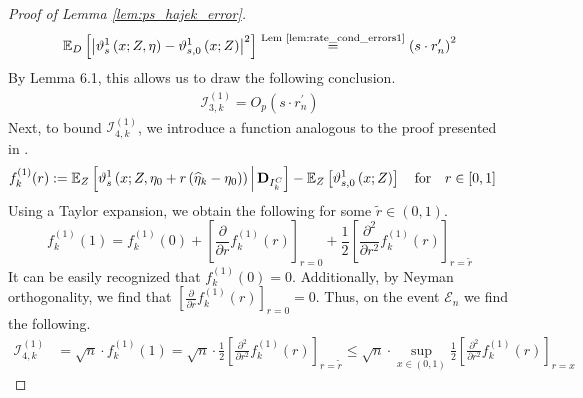 \begin{proof}[Proof of Lemma \ref{lem:ps_hajek_error}]
\begin{equation}
\begin{aligned}
             \mathbb{E}_{D}\left[\left|\vartheta_{s}^{1}\left(x; Z, \eta\right) - \vartheta_{s,0}^{1}\left(x; Z\right)\right|^{2}\right]
             \overset{\text{Lem \ref{lem:rate_cond_errors1}}}{=} \left(s \cdot r_{n}^{\prime}\right)^{2}
        \end{aligned}
    \end{equation}
    By \citet{chernozhukov_doubledebiased_2018} Lemma 6.1, this allows us to draw the following conclusion.
    \begin{equation}
        \begin{aligned}
            \mathcal{I}_{3,k}^{(1)} = O_{p}\left(s \cdot r_{n}^{\prime}\right)
        \end{aligned}
    \end{equation}  
    Next, to bound $\mathcal{I}_{4,k}^{(1)}$, we introduce a function analogous to the proof presented in \citet{chernozhukov_doubledebiased_2018}.
    \begin{equation}
        \begin{aligned}
            f_{k}^{(1)}(r) 
            & := \mathbb{E}_{Z}\left[\vartheta_{s}^{1}\left(x; Z, \eta_{0} + r \left(\widehat{\eta}_{k} - \eta_{0}\right)\right) \, \middle| \, \mathbf{D}_{I_{k}^{C}}\right] - \mathbb{E}_{Z}\left[\vartheta_{s,0}^{1}\left(x; Z\right) \right] 
            \quad \text{for} \quad r \in [0,1]
        \end{aligned}
    \end{equation}
    Using a Taylor expansion, we obtain the following for some $\tilde{r} \in (0,1)$.
    \begin{equation}
        f_{k}^{(1)}(1)
        = f_{k}^{(1)}(0) + \left[\frac{\partial}{\partial r}f_{k}^{(1)}(r)\right]_{r = 0} + \frac{1}{2}\left[\frac{\partial^{2}}{\partial r^{2}}f_{k}^{(1)}(r)\right]_{r = \tilde{r}}
    \end{equation}
    It can be easily recognized that $f_{k}^{(1)}(0) = 0$.
    Additionally, by Neyman orthogonality, we find that $\left[\frac{\partial}{\partial r}f_{k}^{(1)}(r)\right]_{r = 0} = 0$.
    Thus, on the event $\mathcal{E}_{n}$ we find the following.
    \begin{equation}
        \begin{aligned}
            \mathcal{I}_{4,k}^{(1)}
            & = \sqrt{n} \cdot f_{k}^{(1)}(1)
            = \sqrt{n} \cdot \frac{1}{2}\left[\frac{\partial^{2}}{\partial r^{2}}f_{k}^{(1)}(r)\right]_{r = \tilde{r}}
            \leq \sqrt{n} \cdot \sup_{x \in (0,1)} \frac{1}{2}\left[\frac{\partial^{2}}{\partial r^{2}}f_{k}^{(1)}(r)\right]_{r = x}

\end{aligned}
\end{equation}
\end{proof}
